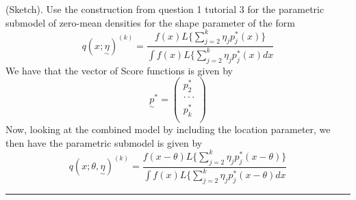 \documentclass[twoside]{article}
\newenvironment{proof}{{\bf Proof:}}{\hfill\rule{2mm}{2mm}}
\newcommand{\utilde}{\underset{\sim}}
\begin{document}
\begin{proof}(Sketch). Use the construction from question 1 tutorial 3 for the parametric submodel of zero-mean densities for the shape parameter of the form 
$$
q(x; \utilde{\eta})^{(k)} = \frac{f(x)L\{\sum_{j=2}^{k}\eta_jp_j^*(x)\}}{\int f(x)L\{\sum_{j=2}^{k}\eta_jp_j^*(x)dx}
$$
We have that the vector of Score functions is given by 
$$
\utilde{p}^{*} = 
\begin{pmatrix}
p_2^*\\
\cdot \cdot \cdot \\
p_k^*\\
\end{pmatrix}
$$
Now, looking at the combined model by including the location parameter, we then have the parametric submodel is given by 
\begin{equation}
q(x;\theta, \utilde{\eta})^{(k)} = \frac{f(x - \theta)L\{\sum_{j=2}^{k}\eta_jp_j^*(x - \theta)\}}{\int f(x)L\{\sum_{j=2}^{k}\eta_jp_j^*(x - \theta)dx}
\end{equation}


\end{proof}
\end{document}
